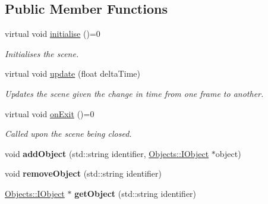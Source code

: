 \subsection*{Public Member Functions}
\begin{DoxyCompactItemize}
\item 
\hypertarget{class_scenes_1_1_i_scene_a4f3faceff8b6ce9209f8268975efe752}{virtual void \hyperlink{class_scenes_1_1_i_scene_a4f3faceff8b6ce9209f8268975efe752}{initialise} ()=0}\label{class_scenes_1_1_i_scene_a4f3faceff8b6ce9209f8268975efe752}

\begin{DoxyCompactList}\small\item\em Initialises the scene. \end{DoxyCompactList}\item 
virtual void \hyperlink{class_scenes_1_1_i_scene_acb97c42a9a93ce1b3d0b800bda680935}{update} (float delta\-Time)
\begin{DoxyCompactList}\small\item\em Updates the scene given the change in time from one frame to another. \end{DoxyCompactList}\item 
\hypertarget{class_scenes_1_1_i_scene_a3abd220af7da336ec3b1c75444254fbc}{virtual void \hyperlink{class_scenes_1_1_i_scene_a3abd220af7da336ec3b1c75444254fbc}{on\-Exit} ()=0}\label{class_scenes_1_1_i_scene_a3abd220af7da336ec3b1c75444254fbc}

\begin{DoxyCompactList}\small\item\em Called upon the scene being closed. \end{DoxyCompactList}\item 
\hypertarget{class_scenes_1_1_i_scene_ac04de08bb2b1af96e8fde0e1b86255ad}{void {\bfseries add\-Object} (std\-::string identifier, \hyperlink{class_objects_1_1_i_object}{Objects\-::\-I\-Object} $\ast$object)}\label{class_scenes_1_1_i_scene_ac04de08bb2b1af96e8fde0e1b86255ad}

\item 
\hypertarget{class_scenes_1_1_i_scene_af8f4f0a6918286c669fc309fe8c6208d}{void {\bfseries remove\-Object} (std\-::string identifier)}\label{class_scenes_1_1_i_scene_af8f4f0a6918286c669fc309fe8c6208d}

\item 
\hypertarget{class_scenes_1_1_i_scene_a7028f9be6feec9aeedc677a8b321bf42}{\hyperlink{class_objects_1_1_i_object}{Objects\-::\-I\-Object} $\ast$ {\bfseries get\-Object} (std\-::string identifier)}\label{class_scenes_1_1_i_scene_a7028f9be6feec9aeedc677a8b321bf42}

\end{DoxyCompactItemize}


